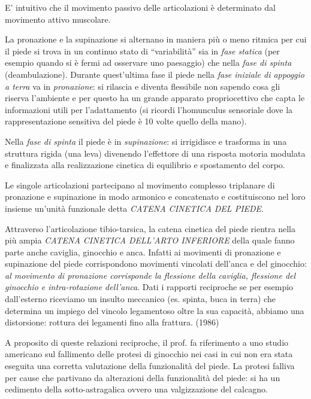 E' intuitivo che il movimento passivo delle articolazioni è determinato dal movimento attivo muscolare.

La pronazione e la supinazione si alternano in maniera più o meno ritmica per cui il piede si trova in un continuo stato di ``variabilità'' sia in \emph{fase statica} (per esempio quando si è fermi ad osservare uno paesaggio) che nella \emph{fase di spinta} (deambulazione). Durante quest'ultima fase il piede nella \emph{fase iniziale di appoggio a terra} va in \emph{pronazione}: si rilascia e
diventa flessibile non sapendo cosa gli riserva l'ambiente e per questo ha un grande apparato propriocettivo che capta le informazioni utili per l'adattamento (si ricordi l'homunculus sensoriale dove la rappresentazione sensitiva del piede è 10 volte quello della mano).

Nella \emph{fase di spinta} il piede è in \emph{supinazione}: si irrigidisce e trasforma in una struttura rigida (una leva) divenendo l'effettore di una risposta motoria modulata e finalizzata alla realizzazione cinetica di equilibrio e spostamento del corpo.

Le singole articolazioni partecipano al movimento complesso triplanare di pronazione e supinazione in modo armonico e concatenato e costituiscono nel loro insieme un'unità funzionale detta \emph{CATENA CINETICA DEL PIEDE}.

Attraverso l'articolazione tibio-tarsica, la catena cinetica del piede rientra nella più ampia \emph{CATENA CINETICA DELL'ARTO INFERIORE} della quale fanno parte anche caviglia, ginocchio e anca. Infatti ai movimenti di pronazione e supinazione del piede corrispondono movimenti vincolati dell'anca e del ginocchio: \emph{al movimento di pronazione corrisponde la flessione della caviglia, flessione del ginocchio e intra-rotazione dell'anca}. Dati i rapporti reciproche se per esempio dall'esterno riceviamo un insulto meccanico (es. spinta, buca in terra) che determina un impiego del vincolo legamentoso oltre la sua capacità, abbiamo una distorsione: rottura dei legamenti fino alla frattura. (1986)

A proposito di queste relazioni reciproche, il prof. fa riferimento a uno studio americano sul fallimento delle protesi di ginocchio nei casi in cui non era stata eseguita una corretta valutazione della funzionalità del piede. La protesi falliva per cause che partivano da alterazioni della funzionalità del piede: si ha un cedimento della sotto-astragalica ovvero una valgizzazione del calcagno.


